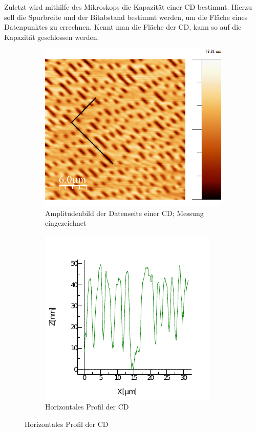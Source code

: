 Zuletzt wird mithilfe des Mikroskops die Kapazität einer CD bestimmt. Hierzu
soll die Spurbreite und der Bitabstand bestimmt werden, um die Fläche eines 
Datenpunktes zu errechnen. Kennt man die Fläche der CD, kann so auf die Kapazität 
geschlossen werden. \par
\begin{figure}
    \centering
    \begin{subfigure}[h]{0.4\textwidth}
        \includegraphics[width=\textwidth]{Mess/cd_paint.png}
        \caption{Amplitudenbild der Datenseite einer CD; Messung eingezeichnet}
        \label{cd}
    \end{subfigure}
    \begin{subfigure}[h]{0.4\textwidth}
        \includegraphics[width=\textwidth]{Mess/profil_cd.pdf}
        \caption{Horizontales Profil der CD}
    \end{subfigure}
\end{figure}

